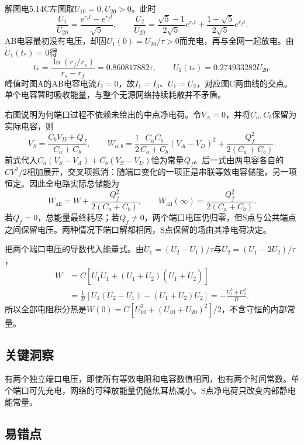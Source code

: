 \documentclass[UTF8,fontset=fandol,a4paper,11pt]{ctexart}
\begin{document}
解图电5.14C左图取$U_{10}=0,U_{20}>0$。此时
\[
\frac{U_1}{U_{20}}=\frac{e^{r_st}-e^{r_ft}}{\sqrt5},\qquad
\frac{U_2}{U_{20}}=\frac{\sqrt5-1}{2\sqrt5}e^{r_st}
+\frac{1+\sqrt5}{2\sqrt5}e^{r_ft}.
\]
AB电容最初没有电压，却因$\dot U_1(0)=U_{20}/\tau>0$而充电，再与全网一起放电。由$\dot U_1(t_*)=0$得
\[
t_* =\frac{\ln(r_f/r_s)}{r_s-r_f}=0.860817882\tau,\qquad
U_1(t_*)=0.274933282U_{20}.
\]
峰值时图A的AB电容电流$I_2=0$，故$I_1=I_3$、$U_1=U_2$，对应图C两曲线的交点。单个电容暂时吸收能量，与整个无源网络持续耗散并不矛盾。

右图说明为何端口过程不依赖未给出的中点净电荷。令$V_A=0$，并将$C_a,C_b$保留为实际电容，则
\[
V_S=\frac{C_bV_D+Q_f}{C_a+C_b},\qquad
W_{a,b}=\frac12\frac{C_aC_b}{C_a+C_b}(V_A-V_D)^2
+\frac{Q_f^2}{2(C_a+C_b)}.
\]
前式代入$C_a(V_S-V_A)+C_b(V_S-V_D)$恰为常量$Q_f$。后一式由两电容各自的$CV^2/2$相加展开，交叉项抵消：随端口变化的一项正是串联等效电容储能，另一项恒定。因此全电路实际总储能为
\[
W_{\mathrm{all}}=W+\frac{Q_f^2}{2(C_a+C_b)},\qquad
W_{\mathrm{all}}(\infty)=\frac{Q_f^2}{2(C_a+C_b)}.
\]
若$Q_f=0$，总能量最终耗尽；若$Q_f\ne0$，两个端口电压仍归零，但S点与公共端点之间保留电压。两种情况下端口解都相同，S点保留的场由其净电荷决定。

把两个端口电压的导数代入能量式。由$\dot U_1=(U_2-U_1)/\tau$与$\dot U_2=(U_1-2U_2)/\tau$，
\[
\begin{aligned}
\dot W&=C[U_1\dot U_1+(U_1+U_2)(\dot U_1+\dot U_2)]\\
&=\frac1R[U_1(U_2-U_1)-(U_1+U_2)U_2]
=-\frac{U_1^2+U_2^2}{R}.
\end{aligned}
\]
所以全部电阻积分热是$W(0)=C[U_{10}^2+(U_{10}+U_{20})^2]/2$，不含守恒的内部常量。




\subsection*{关键洞察}

有两个独立端口电压，即使所有等效电阻和电容数值相同，也有两个时间常数。单个端口可先充电，网络的可释放能量仍随焦耳热减小。S点净电荷只改变内部静电能常量。



\subsection*{易错点}
\end{document}
